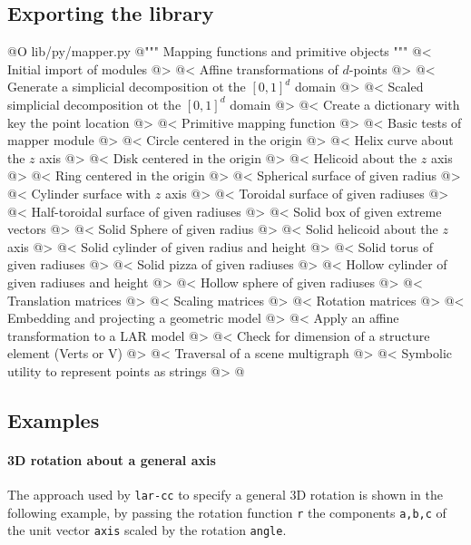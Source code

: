 \documentclass[11pt,oneside]{article}	%
\begin{document}
\subsection{Exporting the library}
@O lib/py/mapper.py
@{""" Mapping functions and primitive objects """
@< Initial import of modules @>
@< Affine transformations of $d$-points @>
@< Generate a simplicial decomposition ot the $[0,1]^d$ domain @>
@< Scaled simplicial decomposition ot the $[0,1]^d$ domain @>
@< Create a dictionary with key the point location @>
@< Primitive mapping function @>
@< Basic tests of mapper module @>
@< Circle centered in the origin @>
@< Helix curve about the $z$ axis @>
@< Disk centered in the origin @>
@< Helicoid about the $z$ axis @>
@< Ring centered in the origin @>
@< Spherical surface of given radius @>
@< Cylinder surface with $z$ axis @>
@< Toroidal surface of given radiuses @>
@< Half-toroidal surface of given radiuses @>
@< Solid box of given extreme vectors @>
@< Solid Sphere of given radius @>
@< Solid helicoid about the $z$ axis @>
@< Solid cylinder of given radius and height @>
@< Solid torus of given radiuses @>
@< Solid pizza of given radiuses @>
@< Hollow cylinder of given radiuses and height @>
@< Hollow sphere of given radiuses @>
@< Translation matrices @>
@< Scaling matrices @>
@< Rotation matrices @>
@< Embedding and projecting a geometric model @>
@< Apply an affine transformation to a LAR model @>
@< Check for dimension of a structure element (Verts or V) @>
@< Traversal of a scene multigraph @>
@< Symbolic utility to represent points as strings @>
@}
\subsection{Examples}

\paragraph{3D rotation about a general axis}
The approach used by \texttt{lar-cc} to specify a general 3D rotation is shown in the following example,
by passing the rotation function \texttt{r} the components \texttt{a,b,c} of the unit vector \texttt{axis} scaled by the rotation \texttt{angle}. 
\end{document}
